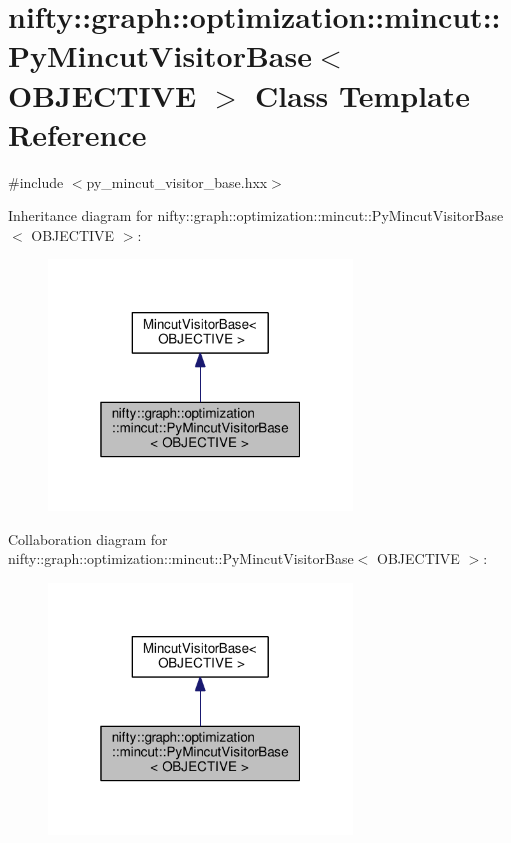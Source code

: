 \hypertarget{classnifty_1_1graph_1_1optimization_1_1mincut_1_1PyMincutVisitorBase}{}\section{nifty\+:\+:graph\+:\+:optimization\+:\+:mincut\+:\+:Py\+Mincut\+Visitor\+Base$<$ O\+B\+J\+E\+C\+T\+I\+V\+E $>$ Class Template Reference}
\label{classnifty_1_1graph_1_1optimization_1_1mincut_1_1PyMincutVisitorBase}


{\ttfamily \#include $<$py\+\_\+mincut\+\_\+visitor\+\_\+base.\+hxx$>$}



Inheritance diagram for nifty\+:\+:graph\+:\+:optimization\+:\+:mincut\+:\+:Py\+Mincut\+Visitor\+Base$<$ O\+B\+J\+E\+C\+T\+I\+V\+E $>$\+:\nopagebreak
\begin{figure}[H]
\begin{center}
\leavevmode
\includegraphics[width=229pt]{classnifty_1_1graph_1_1optimization_1_1mincut_1_1PyMincutVisitorBase__inherit__graph}
\end{center}
\end{figure}


Collaboration diagram for nifty\+:\+:graph\+:\+:optimization\+:\+:mincut\+:\+:Py\+Mincut\+Visitor\+Base$<$ O\+B\+J\+E\+C\+T\+I\+V\+E $>$\+:\nopagebreak
\begin{figure}[H]
\begin{center}
\leavevmode
\includegraphics[width=229pt]{classnifty_1_1graph_1_1optimization_1_1mincut_1_1PyMincutVisitorBase__coll__graph}
\end{center}
\end{figure}
